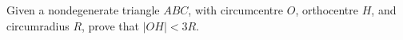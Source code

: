Given a nondegenerate triangle $ABC$, with circumcentre $O$, orthocentre $H$, and circumradius $R$, prove that $|OH| < 3R$.